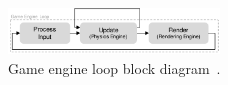 \documentclass[letterpaper, 10 pt, journal, twoside]{IEEEtran}
\begin{document}
\begin{figure}[h]
\centering
\includegraphics[width=0.5\textwidth]{Other/Figures/GameEngineLoopv2.pdf}
\caption{Game engine loop block diagram~\cite{GameProgPatternsBook}.}
\label{GameEngineLoopDiagram}
\end{figure}






% 


\end{document}
